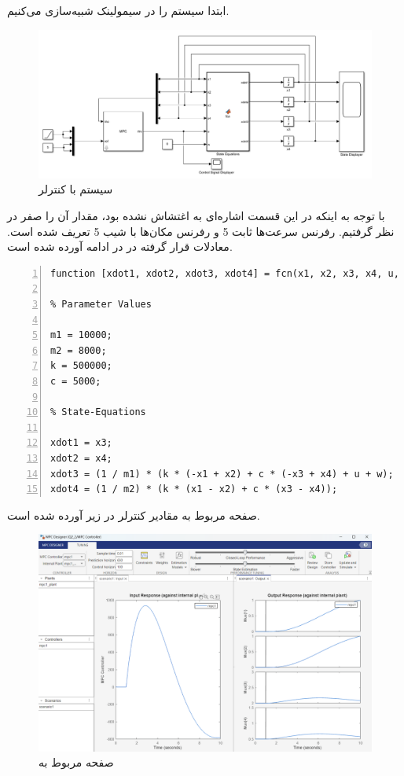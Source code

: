 \documentclass[14pt, a4paper]{extarticle}
\begin{document}
ابتدا سیستم را در سیمولینک شبیه‌سازی می‌کنیم.

 \begin{figure}[h!]
	\centering
	\includegraphics[scale = 0.55]{Q2_1_sim.png}
	\caption{سیستم با کنترلر 
		}
\end{figure}

با توجه به اینکه در این قسمت اشاره‌ای به اغتشاش نشده بود، مقدار آن را صفر در نظر گرفتیم. رفرنس سرعت‌ها ثابت 5 و رفرنس مکان‌ها با شیب 5 تعریف شده است. معادلات قرار گرفته در 
در ادامه آورده شده است.\\
\begin{latin}
	\begin{lstlisting}[frame=single,numbers=left,style=Matlab-Pyglike]
function [xdot1, xdot2, xdot3, xdot4] = fcn(x1, x2, x3, x4, u, w)

% Parameter Values

m1 = 10000;
m2 = 8000;
k = 500000;
c = 5000;

% State-Equations

xdot1 = x3;
xdot2 = x4;
xdot3 = (1 / m1) * (k * (-x1 + x2) + c * (-x3 + x4) + u + w);
xdot4 = (1 / m2) * (k * (x1 - x2) + c * (x3 - x4));
	\end{lstlisting}
\end{latin}	

\newpage
صفحه مربوط به مقادیر کنترلر در زیر آورده شده است.

 \begin{figure}[h!]
	\centering
	\includegraphics[scale = 0.5]{Q2_1_mpc.png}
	\caption{صفحه مربوط به 
		}
\end{figure}
\end{document}
